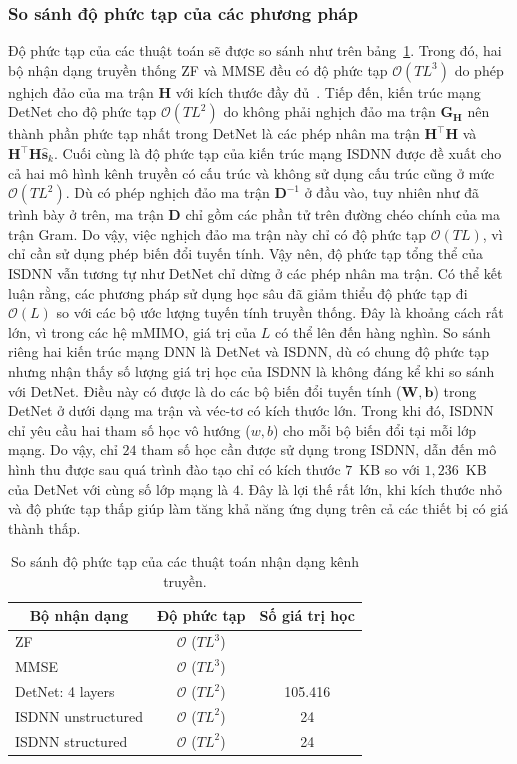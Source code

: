 \subsubsection*{\textbf{So sánh độ phức tạp của các phương pháp}}
Độ phức tạp của các thuật toán sẽ được so sánh như trên bảng~\ref{tab:computational}. Trong đó, hai bộ nhận dạng truyền thống ZF và MMSE đều có độ phức tạp $\mathcal{O}(TL^3)$ do phép nghịch đảo của ma trận $\mathbf{H}$ với kích thước đầy đủ~\cite{Victor1992}. Tiếp đến, kiến trúc mạng DetNet cho độ phức tạp $\mathcal{O}(TL^2)$ do không phải nghịch đảo ma trận $\mathbf{G}_\mathbf{H}$ nên thành phần phức tạp nhất trong DetNet là các phép nhân ma trận $\mathbf{H}^\top \mathbf{H}$ và $\mathbf{H}^\top \mathbf{H} \hat{\mathbf{s}}_k$. Cuối cùng là độ phức tạp của kiến trúc mạng ISDNN được đề xuất cho cả hai mô hình kênh truyền có cấu trúc và không sử dụng cấu trúc cũng ở mức $\mathcal{O}(TL^2)$. Dù có phép nghịch đảo ma trận $\mathbf{D}^{-1}$ ở đầu vào, tuy nhiên như đã trình bày ở trên, ma trận $\mathbf{D}$ chỉ gồm các phần tử trên đường chéo chính của ma trận Gram. Do vậy, việc nghịch đảo ma trận này chỉ có độ phức tạp $\mathcal{O}(TL)$, vì chỉ cần sử dụng phép biến đổi tuyến tính. Vậy nên, độ phức tạp tổng thể của ISDNN vẫn tương tự như DetNet chỉ dừng ở các phép nhân ma trận. Có thể kết luận rằng, các phương pháp sử dụng học sâu đã giảm thiểu độ phức tạp đi $\mathcal{O}(L)$ so với các bộ ước lượng tuyến tính truyền thống. Đây là khoảng cách rất lớn, vì trong các hệ mMIMO, giá trị của $L$ có thể lên đến hàng nghìn. So sánh riêng hai kiến trúc mạng DNN là DetNet và ISDNN, dù có chung độ phức tạp nhưng nhận thấy số lượng giá trị học của ISDNN là không đáng kể khi so sánh với DetNet. Điều này có được là do các bộ biến đổi tuyến tính ($\mathbf{W}, \mathbf{b}$) trong DetNet ở dưới dạng ma trận và véc-tơ có kích thước lớn. Trong khi đó, ISDNN chỉ yêu cầu hai tham số học vô hướng ($w, b$) cho mỗi bộ biến đổi tại mỗi lớp mạng. Do vậy, chỉ $24$ tham số học cần được sử dụng trong ISDNN, dẫn đến mô hình thu được sau quá trình đào tạo chỉ có kích thước $7$~KB so với $1,236$~KB của DetNet với cùng số lớp mạng là $4$. Đây là lợi thế rất lớn, khi kích thước nhỏ và độ phức tạp thấp giúp làm tăng khả năng ứng dụng trên cả các thiết bị có giá thành thấp.
\begin{table}[t]
    \centering
    \caption{So sánh độ phức tạp của các thuật toán nhận dạng kênh truyền.}
    \label{tab:computational}
    \begin{tabular}{l|c|c}
    \hline
    \hline
    \multicolumn{1}{c|}{\textbf{Bộ nhận dạng}} & \textbf{Độ phức tạp} & \textbf{Số giá trị học} \\ \hline
    ZF & $\mathcal{O}$ ($TL^3$) &  \\ \hline
    MMSE & $\mathcal{O}$ ($TL^3$) &  \\ \hline
    DetNet: 4 layers~\cite{Samuel2019} & $\mathcal{O}$ ($TL^2$) & 105.416 \\ \hline
    ISDNN unstructured& $\mathcal{O}$ ($TL^2$) & 24 \\ \hline
    ISDNN structured& $\mathcal{O}$ ($TL^2$) & 24 \\ \hline
    \end{tabular}
\end{table}


